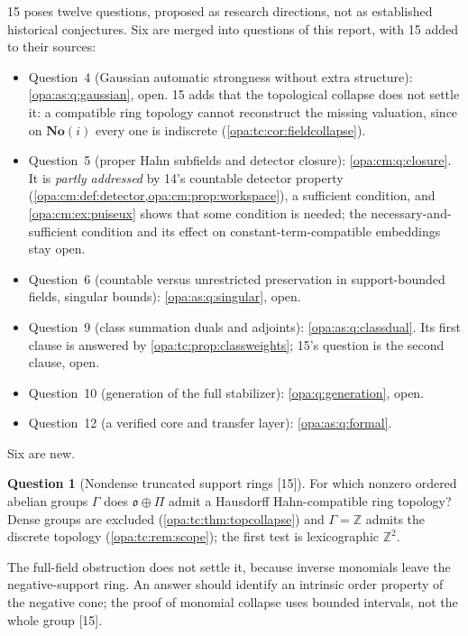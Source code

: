 \documentclass[11pt,oneside]{article}
\numberwithin{equation}{section}
\theoremstyle{definition}
\newtheorem{question}[question]{Question}
\theoremstyle{remark}
\newcommand{\SC}{\mathbf{No}(i)}
\newcommand{\Z}{\mathbb Z}
\newcommand{\oo}{\mathfrak o}
\newcommand{\src}[1]{\textup{\textsf{\small[#1]}}}
\begin{document}
15 poses twelve questions, proposed as research directions, not as established historical conjectures.
Six are merged into questions of this report, with 15 added to their sources:
\begin{itemize}[itemsep=2pt]
\item Question~4 (Gaussian automatic strongness without extra structure): \cref{opa:as:q:gaussian}, open.
15 adds that the topological collapse does not settle it: a compatible ring topology cannot reconstruct
the missing valuation, since on $\SC$ every one is indiscrete (\cref{opa:tc:cor:fieldcollapse}).
\item Question~5 (proper Hahn subfields and detector closure): \cref{opa:cm:q:closure}. It is
\emph{partly addressed} by 14's countable detector property (\cref{opa:cm:def:detector,opa:cm:prop:workspace}),
a sufficient condition, and \cref{opa:cm:ex:puiseux} shows that some condition is needed; the
necessary-and-sufficient condition and its effect on constant-term-compatible embeddings stay open.
\item Question~6 (countable versus unrestricted preservation in support-bounded fields, singular bounds):
\cref{opa:as:q:singular}, open.
\item Question~9 (class summation duals and adjoints): \cref{opa:as:q:classdual}. Its first clause is
answered by \cref{opa:tc:prop:classweights}; 15's question is the second clause, open.
\item Question~10 (generation of the full stabilizer): \cref{opa:q:generation}, open.
\item Question~12 (a verified core and transfer layer): \cref{opa:as:q:formal}.
\end{itemize}
Six are new.

\begin{question}[Nondense truncated support rings \src{15}]\label{opa:tc:q:nondense}
For which nonzero ordered abelian groups $\Gamma$ does $\oo\oplus\Pi$ admit a Hausdorff Hahn-compatible ring
topology? Dense groups are excluded (\cref{opa:tc:thm:topcollapse}) and $\Gamma=\Z$ admits the discrete
topology (\cref{opa:tc:rem:scope}); the first test is lexicographic $\Z^2$.
\end{question}
The full-field obstruction does not settle it, because inverse monomials leave the negative-support ring.
An answer should identify an intrinsic order property of the negative cone; the proof of monomial collapse
uses bounded intervals, not the whole group \src{15}.
\end{document}
